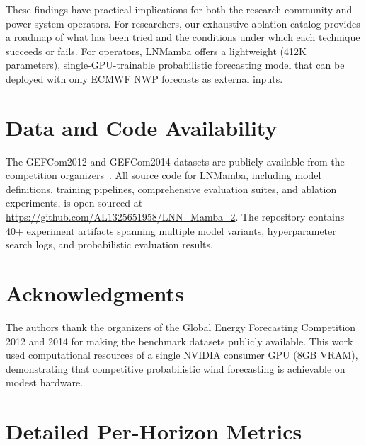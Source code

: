 \documentclass[review]{elsarticle}
\begin{document}
These findings have practical implications for both the research community and power system operators. For researchers, our exhaustive ablation catalog provides a roadmap of what has been tried and the conditions under which each technique succeeds or fails. For operators, LNMamba offers a lightweight (412K parameters), single-GPU-trainable probabilistic forecasting model that can be deployed with only ECMWF NWP forecasts as external inputs.

\section*{Data and Code Availability}

The GEFCom2012 and GEFCom2014 datasets are publicly available from the competition organizers~\cite{hong2014global,hong2016probabilistic}. All source code for LNMamba, including model definitions, training pipelines, comprehensive evaluation suites, and ablation experiments, is open-sourced at \url{https://github.com/AL1325651958/LNN_Mamba_2}. The repository contains 40+ experiment artifacts spanning multiple model variants, hyperparameter search logs, and probabilistic evaluation results.

\section*{Acknowledgments}

The authors thank the organizers of the Global Energy Forecasting Competition 2012 and 2014 for making the benchmark datasets publicly available. This work used computational resources of a single NVIDIA consumer GPU (8GB VRAM), demonstrating that competitive probabilistic wind forecasting is achievable on modest hardware.




\appendix
\section{Detailed Per-Horizon Metrics}
\end{document}
